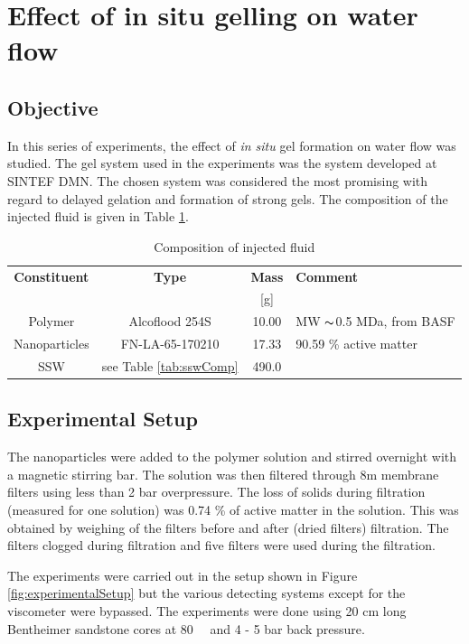 \section{Effect of in situ gelling on water flow} \label{sec:inSituGelling}
\subsection{Objective}
In this series of experiments, the effect of \textit{in situ} gel  formation on water flow was studied. The gel system used in the experiments was the system developed at SINTEF DMN. The chosen system was considered the most promising with regard to delayed gelation and formation of strong gels. The composition of the injected fluid is given in Table \ref{tab:injComp}. 
\begin{table} 
\centering
\caption{Composition of injected fluid}
\label{tab:injComp}
\begin{tabular}{c c c l } 
\toprule
\textbf{Constituent} & \textbf{Type} & \textbf{Mass} & \textbf{Comment}\\ 
&& [g] & \\
\midrule 
Polymer & Alcoflood 254S & 10.00 & MW $\thicksim$0.5 MDa, from BASF\\
Nanoparticles & FN-LA-65-170210 & 17.33 & 90.59 \% active matter \\ 
SSW & see Table \ref{tab:sswComp} & 490.0 &  \\ 
\bottomrule
\end{tabular}
\end{table}

\subsection{Experimental Setup}

The nanoparticles  were added to the polymer solution and stirred overnight with a magnetic stirring bar. The solution was then filtered through 8\micro m membrane filters using less than 2 bar overpressure. The loss of solids during filtration (measured for one solution) was 0.74 \% of active matter in the solution. This was obtained by weighing of the filters before and after (dried filters) filtration. The filters clogged during filtration and five filters were used during the filtration.

The experiments were carried out in the setup shown in Figure \ref{fig:experimentalSetup} but the various detecting systems except for the viscometer were bypassed. The experiments were done using 20 cm long Bentheimer sandstone cores at 80~\celsius~ and 4 - 5 bar back pressure.


